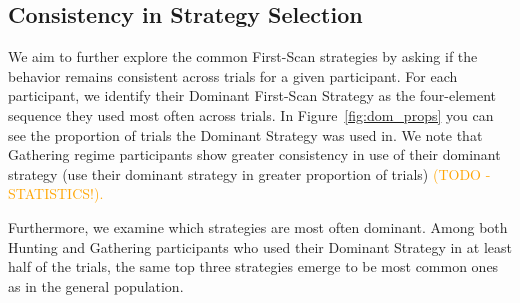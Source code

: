 \documentclass{article}
\begin{document}
    \subsection{Consistency in Strategy Selection}   
    We aim to further explore the common First-Scan strategies by asking if the behavior remains consistent across trials for a given participant. For each participant, we identify their Dominant First-Scan Strategy as the four-element sequence they used most often across trials. In Figure~\ref{fig:dom_props} you can see the proportion of trials the Dominant Strategy was used in. We note that Gathering regime participants show greater consistency in use of their dominant strategy (use their dominant strategy in greater proportion of trials) \textcolor{orange}{(TODO - STATISTICS!).} 

    Furthermore, we examine which strategies are most often dominant. Among both Hunting and Gathering participants who used their Dominant Strategy in at least half of the trials, the same top three strategies emerge to be most common ones as in the general population.
\end{document}
